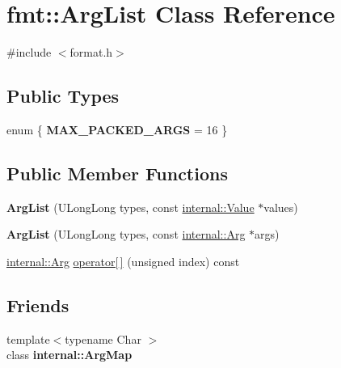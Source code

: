 \hypertarget{classfmt_1_1ArgList}{}\section{fmt\+:\+:Arg\+List Class Reference}
\label{classfmt_1_1ArgList}


{\ttfamily \#include $<$format.\+h$>$}

\subsection*{Public Types}
\begin{DoxyCompactItemize}
\item 
enum \{ {\bfseries M\+A\+X\+\_\+\+P\+A\+C\+K\+E\+D\+\_\+\+A\+R\+GS} = 16
 \}\hypertarget{classfmt_1_1ArgList_a4023f9c6f9dc0cb62d97f8fecc702d7c}{}\label{classfmt_1_1ArgList_a4023f9c6f9dc0cb62d97f8fecc702d7c}

\end{DoxyCompactItemize}
\subsection*{Public Member Functions}
\begin{DoxyCompactItemize}
\item 
{\bfseries Arg\+List} (U\+Long\+Long types, const \hyperlink{structfmt_1_1internal_1_1Value}{internal\+::\+Value} $\ast$values)\hypertarget{classfmt_1_1ArgList_a02125120a594f45fdad426ef003aa342}{}\label{classfmt_1_1ArgList_a02125120a594f45fdad426ef003aa342}

\item 
{\bfseries Arg\+List} (U\+Long\+Long types, const \hyperlink{structfmt_1_1internal_1_1Arg}{internal\+::\+Arg} $\ast$args)\hypertarget{classfmt_1_1ArgList_ae811ca8034f8c88fe612e0d23ae810fe}{}\label{classfmt_1_1ArgList_ae811ca8034f8c88fe612e0d23ae810fe}

\item 
\hyperlink{structfmt_1_1internal_1_1Arg}{internal\+::\+Arg} \hyperlink{classfmt_1_1ArgList_ad2c2672388e003aa70d9c948ac8140cd}{operator\mbox{[}$\,$\mbox{]}} (unsigned index) const 
\end{DoxyCompactItemize}
\subsection*{Friends}
\begin{DoxyCompactItemize}
\item 
{\footnotesize template$<$typename Char $>$ }\\class {\bfseries internal\+::\+Arg\+Map}\hypertarget{classfmt_1_1ArgList_a6e257e0433f829293f077ba81f205ab3}{}\label{classfmt_1_1ArgList_a6e257e0433f829293f077ba81f205ab3}

\end{DoxyCompactItemize}


